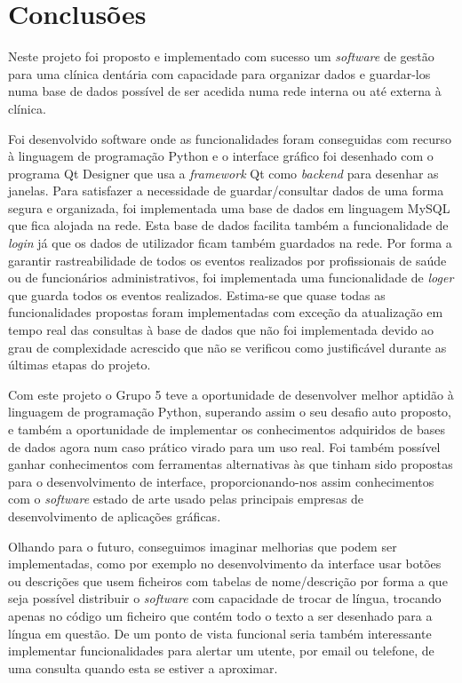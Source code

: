 \documentclass[11pt,a4paper,twoside]{report}
\begin{document}
\chapter{Conclusões}

Neste projeto foi proposto e implementado com sucesso um \textit{software} de gestão para uma clínica dentária com capacidade para organizar dados e guardar-los numa base de dados possível de ser acedida numa rede interna ou até externa à clínica.

Foi desenvolvido software onde as funcionalidades foram conseguidas com recurso à linguagem de programação Python e o interface gráfico foi desenhado com o programa Qt Designer que usa a \textit{framework} Qt como \textit{backend} para desenhar as janelas.
Para satisfazer a necessidade de guardar/consultar dados de uma forma segura e organizada, foi implementada uma base de dados em linguagem MySQL que fica alojada na rede.
Esta base de dados facilita também a funcionalidade de \textit{login} já que os dados de utilizador ficam também guardados na rede.
Por forma a garantir rastreabilidade de todos os eventos realizados por profissionais de saúde ou de funcionários administrativos, foi implementada uma funcionalidade de \textit{loger} que guarda todos os eventos realizados.
Estima-se que quase todas as funcionalidades propostas foram implementadas com exceção da atualização em tempo real das consultas à base de dados que não foi implementada devido ao grau de complexidade acrescido que não se verificou como justificável durante as últimas etapas do projeto.

Com este projeto o Grupo 5 teve a oportunidade de desenvolver melhor aptidão à linguagem de programação Python, superando assim o seu desafio auto proposto, e também a oportunidade de implementar os conhecimentos adquiridos de bases de dados agora num caso prático virado para um uso real.
Foi também possível ganhar conhecimentos com ferramentas alternativas às que tinham sido propostas para o desenvolvimento de interface, proporcionando-nos assim conhecimentos com o \textit{software} estado de arte usado pelas principais empresas de desenvolvimento de aplicações gráficas.

Olhando para o futuro, conseguimos imaginar melhorias que podem ser implementadas, como por exemplo no desenvolvimento da interface usar botões ou descrições que usem ficheiros com tabelas de nome/descrição por forma a que seja possível distribuir o \textit{software} com capacidade de trocar de língua, trocando apenas no código um ficheiro que contém todo o texto a ser desenhado para a língua em questão.
De um ponto de vista funcional seria também interessante implementar funcionalidades para alertar um utente, por email ou telefone, de uma consulta quando esta se estiver a aproximar.



\end{document}
